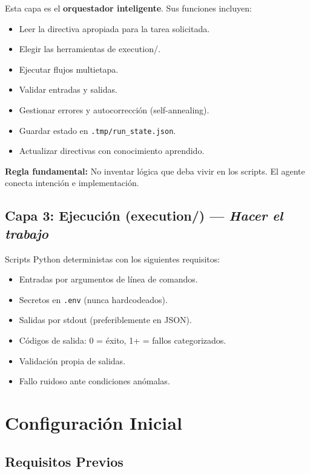 \documentclass[a4paper,12pt]{article}
\begin{document}
Esta capa es el \textbf{orquestador inteligente}. Sus funciones incluyen:

\begin{itemize}
    \item Leer la directiva apropiada para la tarea solicitada.
    \item Elegir las herramientas de execution/.
    \item Ejecutar flujos multietapa.
    \item Validar entradas y salidas.
    \item Gestionar errores y autocorrección (self-annealing).
    \item Guardar estado en \texttt{.tmp/run\_state.json}.
    \item Actualizar directivas con conocimiento aprendido.
\end{itemize}

\textbf{Regla fundamental:} No inventar lógica que deba vivir en los scripts. El agente conecta intención e implementación.

\subsection{Capa 3: Ejecución (execution/) --- \textit{Hacer el trabajo}}

Scripts Python deterministas con los siguientes requisitos:

\begin{itemize}
    \item Entradas por argumentos de línea de comandos.
    \item Secretos en \texttt{.env} (nunca hardcodeados).
    \item Salidas por stdout (preferiblemente en JSON).
    \item Códigos de salida: 0 = éxito, 1+ = fallos categorizados.
    \item Validación propia de salidas.
    \item Fallo ruidoso ante condiciones anómalas.
\end{itemize}

\section{Configuración Inicial}

\subsection{Requisitos Previos}
\end{document}
